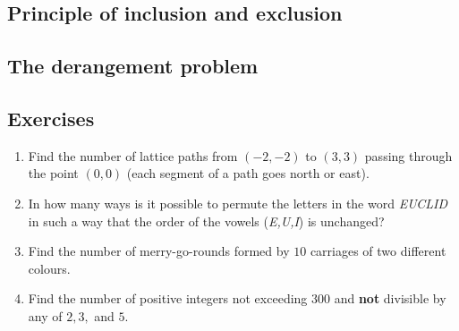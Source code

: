 \subsection{Principle of inclusion and exclusion}

\subsection{The derangement problem}

\subsection{Exercises}

\begin{enumerate}
    \item Find the number of lattice paths from $(-2, -2)$ to $(3,3)$ passing through the point $(0,0)$ (each segment of a path goes north or east).
    \item In how many ways is it possible to permute the letters in the word \textit{EUCLID} in such a way that the order of the vowels (\textit{E,U,I}) is unchanged?
    \item Find the number of merry-go-rounds formed by $10$ carriages of two different colours.
    \item Find the number of positive integers not exceeding $300$ and \textbf{not} divisible by any of $2,3,$ and $5$.
\end{enumerate}